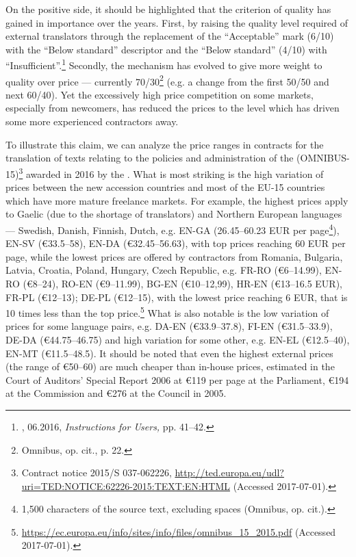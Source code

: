 \documentclass[output=paper]{langsci/langscibook}
\begin{document}
On the positive side, it should be highlighted that the criterion of quality has gained in importance over the years. First, by raising the quality level required of external translators through the replacement of the ``Acceptable'' mark (6/10) with the ``Below standard'' descriptor and the ``Below standard'' (4/10) with ``Insufficient''.\footnote{, 06.2016, \textit{Instructions for Users,} pp. 41--42.} Secondly, the mechanism has evolved to give more weight to quality over price — currently 70/30\footnote{Omnibus, op. cit., p. 22.} (e.g. a change from the first 50/50 and next 60/40). Yet the excessively high price competition on some markets, especially from newcomers, has reduced the prices to the level which has driven some more experienced contractors away. 

To illustrate this claim, we can analyze the price ranges in contracts for the translation of  texts relating to the policies and administration of the  (OMNIBUS-15)\footnote{Contract notice 2015/S 037-062226, \url{http://ted.europa.eu/udl?uri=TED:NOTICE:62226-2015:TEXT:EN:HTML} (Accessed 2017-07-01).} awarded in 2016 by the . What is most striking is the high variation of prices between the new accession countries and most of the EU-15 countries which have more mature freelance markets. For example, the highest prices apply to Gaelic (due to the shortage of translators) and Northern European languages — Swedish, Danish, Finnish, Dutch, e.g. EN-GA (26.45--60.23 EUR per page\footnote{1,500 characters of the source text, excluding spaces (Omnibus, op. cit.).}), EN-SV ({\euro}33.5--58), EN-DA ({\euro}32.45--56.63), with top prices reaching 60 EUR per page, while the lowest prices are offered by contractors from Romania, Bulgaria, Latvia, Croatia, Poland, Hungary, Czech Republic, e.g. FR-RO ({\euro}6--14.99), EN-RO ({\euro}8--24), RO-EN ({\euro}9--11.99), BG-EN ({\euro}10--12,99), HR-EN ({\euro}13--16.5 EUR), FR-PL ({\euro}12--13); DE-PL ({\euro}12--15), with the lowest price reaching 6 EUR, that is 10 times less than the top price.\footnote{\url{https://ec.europa.eu/info/sites/info/files/omnibus_15_2015.pdf} (Accessed 2017-07-01).} What is also notable is the low variation of prices for some language pairs, e.g. DA-EN ({\euro}33.9--37.8), FI-EN ({\euro}31.5--33.9), DE-DA ({\euro}44.75--46.75) and high variation for some other, e.g. EN-EL ({\euro}12.5--40), EN-MT ({\euro}11.5--48.5). It should be noted that even the highest external prices (the range of {\euro}50--60) are much cheaper than in-house prices, estimated in the Court of Auditors’ Special Report 2006 at {\euro}119 per page at the Parliament, {\euro}194 at the Commission and {\euro}276 at the Council in 2005.
\end{document}
